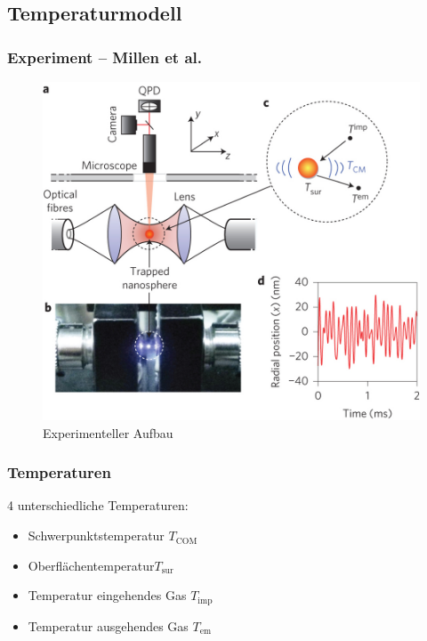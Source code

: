 \documentclass{beamer}
\begin{document}
\subsection{Temperaturmodell}
\begin{frame}
\frametitle{Experiment -- Millen et al.}
\begin{center}
\begin{figure}
\includegraphics[scale=0.2]{../images/nnano_millen.jpg}
\caption{Experimenteller Aufbau \cite{MillenJ.2014}}
\end{figure}
\end{center}
\end{frame}

\begin{frame}
\frametitle{Temperaturen}
4 unterschiedliche Temperaturen:
\begin{itemize}
\item Schwerpunktstemperatur $T_\text{COM}$
\item Oberflächentemperatur$T_\text{sur}$
\item Temperatur eingehendes Gas $T_\text{imp}$
\item Temperatur ausgehendes Gas $T_\text{em}$
\end{itemize}
\end{frame}
\end{document}
